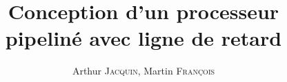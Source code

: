 \documentclass{hibiscus}
\title{Conception d'un processeur pipeliné avec ligne de retard}
\author{Arthur \textsc{Jacquin}, Martin \textsc{François}}
\begin{document}
\coverpage                      %
\foreword                       %
\tableofcontents









\bibliographyreferenceslist     %



\appendix
% 
\end{document}
